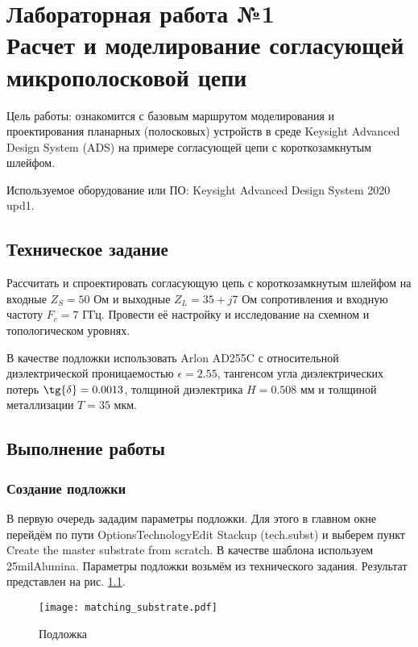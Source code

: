 \chapter{Лабораторная работа №1 \\
Расчет и моделирование согласующей микрополосковой цепи}

Цель работы: ознакомится с базовым маршрутом моделирования и проектирования планарных (полосковых) устройств в среде Keysight Advanced Design System (ADS) на примере согласующей цепи с короткозамкнутым шлейфом.

Используемое оборудование или ПО: Keysight Advanced Design System 2020 upd1.

\section{Техническое задание}

Рассчитать и спроектировать согласующую цепь с короткозамкнутым шлейфом на входные $Z_S = 50\text{~Ом}$ и выходные $Z_L = 35 + j 7 \text{~Ом}$ сопротивления и входную частоту $F_c = 7 \text{~ГГц}$.
Провести её настройку и исследование на схемном и топологическом уровнях.

В качестве подложки использовать Arlon AD255C с относительной диэлектрической проницаемостью $\epsilon = 2.55$, тангенсом угла диэлектрических потерь $\tg{\delta} = 0.0013$, толщиной диэлектрика $H = 0.508 \text{~мм}$ и толщиной металлизации $T = 35 \text{~мкм}$.

\section{Выполнение работы}

\subsection{Создание подложки}

В первую очередь зададим параметры подложки. Для этого в главном окне перейдём по пути Options\textrightarrow Technology\textrightarrow Edit Stackup (tech.subst) и выберем пункт Create the master substrate from scratch. В качестве шаблона используем 25milAlumina. Параметры подложки возьмём из технического задания. Результат представлен на рис. \ref{fig:matching_substrate}.

\begin{figure}
    \centering
    \texttt{[image: matching\_substrate.pdf]}
    \caption{Подложка}
    \label{fig:matching_substrate}
\end{figure}

